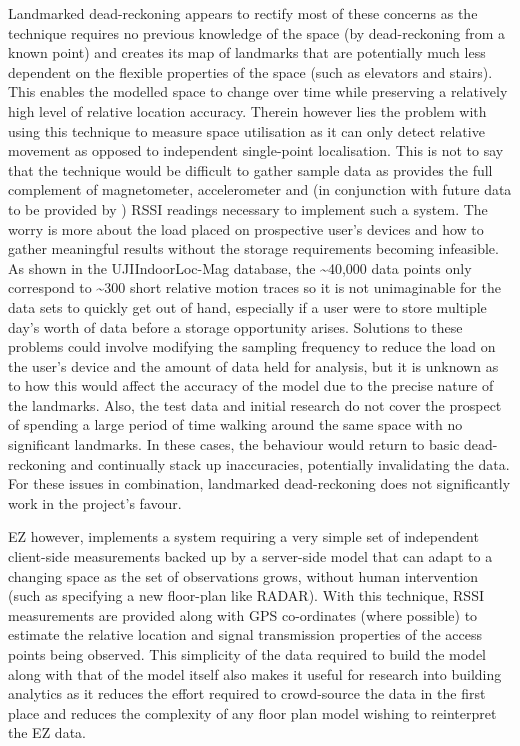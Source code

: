 \documentclass{UoYCSproject}
\begin{document}
        Landmarked dead-reckoning appears to rectify most of these concerns as the technique requires no previous knowledge of the space (by dead-reckoning from a known point) and creates its map of landmarks that are potentially much less dependent on the flexible properties of the space (such as elevators and stairs). This enables the modelled space to change over time while preserving a relatively high level of relative location accuracy. Therein however lies the problem with using this technique to measure space utilisation as it can only detect relative movement as opposed to independent single-point localisation. This is not to say that the technique would be difficult to gather sample data as \citet{torres2015ujiindoorlocmag} provides the full complement of magnetometer, accelerometer and (in conjunction with future data to be provided by \citet{JoaquinEmail}) RSSI readings necessary to implement such a system. The worry is more about the load placed on prospective user's devices and how to gather meaningful results without the storage requirements becoming infeasible. As shown in the UJIIndoorLoc-Mag database, the \textasciitilde40,000 data points only correspond to \textasciitilde300 short relative motion traces so it is not unimaginable for the data sets to quickly get out of hand, especially if a user were to store multiple day's worth of data before a storage opportunity arises. Solutions to these problems could involve modifying the sampling frequency to reduce the load on the user's device and the amount of data held for analysis, but it is unknown as to how this would affect the accuracy of the model due to the precise nature of the landmarks. Also, the test data and initial research do not cover the prospect of spending a large period of time walking around the same space with no significant landmarks. In these cases, the behaviour would return to basic dead-reckoning and continually stack up inaccuracies, potentially invalidating the data. For these issues in combination, landmarked dead-reckoning does not significantly work in the project's favour.
        
        EZ however, implements a system requiring a very simple set of independent client-side measurements backed up by a server-side model that can adapt to a changing space as the set of observations grows, without human intervention (such as specifying a new floor-plan like RADAR). With this technique, RSSI measurements are provided along with GPS co-ordinates (where possible) to estimate the relative location and signal transmission properties of the access points being observed. This simplicity of the data required to build the model along with that of the model itself also makes it useful for research into building analytics as it reduces the effort required to crowd-source the data in the first place and reduces the complexity of any floor plan model wishing to reinterpret the EZ data.
        
\end{document}

